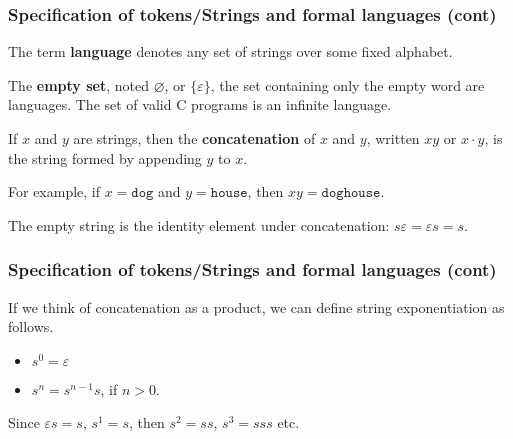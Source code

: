 % 
\begin{frame}
\frametitle{Specification of tokens/Strings and formal languages (cont)}

The term \textbf{language} denotes any set of strings over some fixed
alphabet. 

\bigskip

The \textbf{empty set}, noted \(\varnothing\), or \(\{\varepsilon\}\),
the set containing only the empty word are languages. The set of valid
C programs is an infinite language.

\bigskip

If \(x\) and \(y\) are strings, then the \textbf{concatenation}
of \(x\) and \(y\), written \(xy\) or \(x \cdot y\), is the string
formed by appending \(y\) to \(x\). 

\bigskip

For example, if \(x = \texttt{dog}\) and \(y = \texttt{house}\),
then \(xy = \texttt{doghouse}\).

\bigskip

The empty string is the identity element under
concatenation: \(s \varepsilon = \varepsilon s = s\).

\end{frame}

% 
\begin{frame}
\frametitle{Specification of tokens/Strings and formal languages (cont)}

If we think of concatenation as a product, we can define string
exponentiation as follows.
\begin{itemize}

  \item \(s^0 = \varepsilon\)

  \item \(s^{n} = s^{n-1} s\), if \(n > 0\).

\end{itemize}
Since \(\varepsilon s = s\), \(s^1 = s\), then \(s^2 = ss\), \(s^3 =
sss\) etc.

\end{frame}

